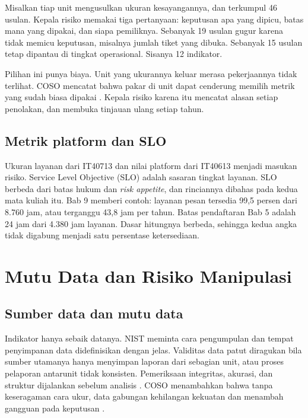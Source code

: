\begin{kasus}[title={Kasus Medikara Health: Dari 46 Usulan menjadi 12 Indikator}]
Misalkan tiap unit mengusulkan ukuran kesayangannya, dan terkumpul 46 usulan. Kepala risiko memakai
tiga pertanyaan: keputusan apa yang dipicu, batas mana yang dipakai, dan siapa pemiliknya. Sebanyak
19 usulan gugur karena tidak memicu keputusan, misalnya jumlah tiket yang dibuka. Sebanyak 15 usulan
tetap dipantau di tingkat operasional. Sisanya 12 indikator.

Pilihan ini punya biaya. Unit yang ukurannya keluar merasa pekerjaannya tidak terlihat. COSO
mencatat bahwa pakar di unit dapat cenderung memilih metrik yang sudah biasa dipakai
\cite{c13-coso-kri}. Kepala risiko karena itu mencatat alasan setiap penolakan, dan membuka tinjauan
ulang setiap tahun.
\end{kasus}

\subsection*{Metrik platform dan SLO}

Ukuran layanan dari IT40713 dan nilai platform dari IT40613 menjadi masukan risiko. Service Level
Objective (SLO) adalah sasaran tingkat layanan. SLO berbeda dari batas hukum dan \textit{risk
appetite}, dan rinciannya dibahas pada kedua mata kuliah itu. Bab 9 memberi contoh: layanan pesan
tersedia 99,5 persen dari 8.760 jam, atau terganggu 43,8 jam per tahun. Batas pendaftaran Bab 5
adalah 24 jam dari 4.380 jam layanan. Dasar hitungnya berbeda, sehingga kedua angka tidak digabung
menjadi satu persentase ketersediaan.

\section{Mutu Data dan Risiko Manipulasi}

\subsection*{Sumber data dan mutu data}

Indikator hanya sebaik datanya. NIST meminta cara pengumpulan dan tempat penyimpanan data
didefinisikan dengan jelas. Validitas data patut diragukan bila sumber utamanya hanya menyimpan
laporan dari sebagian unit, atau proses pelaporan antarunit tidak konsisten. Pemeriksaan integritas,
akurasi, dan struktur dijalankan sebelum analisis \cite{c13-nist80055v1}. COSO menambahkan bahwa
tanpa keseragaman cara ukur, data gabungan kehilangan kekuatan dan menambah gangguan pada keputusan
\cite{c13-coso-kri}.

